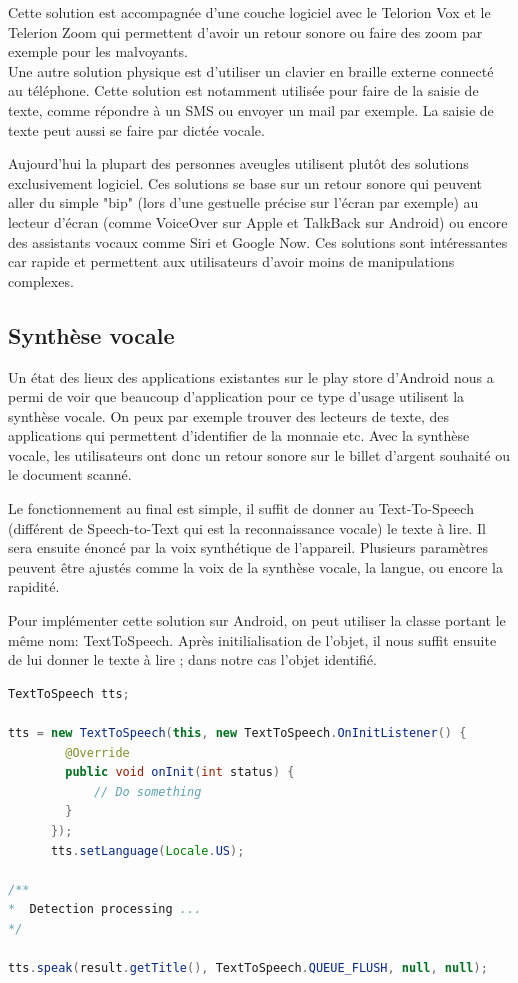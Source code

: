\documentclass[UTF8]{EPURapport}
\begin{document}
Cette solution est accompagnée d'une couche logiciel avec le Telorion Vox et le Telerion Zoom qui permettent d'avoir un retour sonore ou faire des zoom par exemple pour les malvoyants. \\

Une autre solution physique est d'utiliser un clavier en braille externe connecté au téléphone. Cette solution est notamment utilisée pour faire de la saisie de texte, comme répondre à un SMS ou envoyer un mail par exemple. La saisie de texte peut aussi se faire par dictée vocale. 

Aujourd'hui la plupart des personnes aveugles utilisent plutôt des solutions exclusivement logiciel. Ces solutions se base sur un retour sonore qui peuvent aller du simple "bip" (lors d'une gestuelle précise sur l'écran par exemple) au lecteur d'écran (comme VoiceOver sur Apple et TalkBack sur Android) ou encore des assistants vocaux comme Siri et Google Now. Ces solutions sont intéressantes car rapide et permettent aux utilisateurs d'avoir moins de manipulations complexes.

\subsection{Synthèse vocale}
Un état des lieux des applications existantes sur le play store d'Android nous a permi de voir que beaucoup d'application pour ce type d'usage utilisent la synthèse vocale. On peux par exemple trouver des lecteurs de texte, des applications qui permettent d'identifier de la monnaie etc. Avec la synthèse vocale, les utilisateurs ont donc un retour sonore sur le billet d'argent souhaité ou le document scanné.

Le fonctionnement au final est simple, il suffit de donner au Text-To-Speech (différent de Speech-to-Text qui est la reconnaissance vocale) le texte à lire. Il sera ensuite énoncé par la voix synthétique de l'appareil. Plusieurs paramètres peuvent être ajustés comme la voix de la synthèse vocale, la langue, ou encore la rapidité.

Pour implémenter cette solution sur Android, on peut utiliser la classe portant le même nom: TextToSpeech. Après initilialisation de l'objet, il nous suffit ensuite de lui donner le texte à lire ; dans notre cas l'objet identifié. \\

\begin{lstlisting}[language=Java]
TextToSpeech tts;

tts = new TextToSpeech(this, new TextToSpeech.OnInitListener() {
        @Override
        public void onInit(int status) {
    		// Do something
        }
      });
      tts.setLanguage(Locale.US);

/**
*  Detection processing ...
*/

tts.speak(result.getTitle(), TextToSpeech.QUEUE_FLUSH, null, null);
\end{lstlisting}
\end{document}

